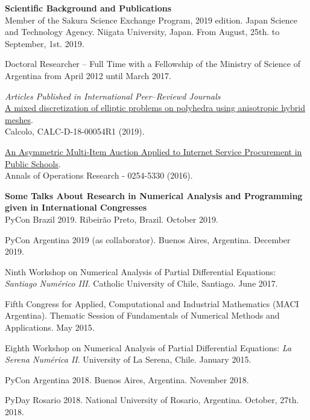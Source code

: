 \textbf{Scientific Background and Publications}\\[6pt]
Member of the Sakura Science Exchange Program, 2019 edition. Japan Science and
Technology Agency. Niigata University, Japan. From August, 25th. to September, 1st. 2019.

Doctoral Researcher -- Full Time with a Fellowship of the Ministry of 
Science of Argentina from April 2012 until March 2017.

\emph{Articles Published in International Peer--Reviewd Journals}\\
\href{http://em.rdcu.be/wf/click?upn=lMZy1lernSJ7apc5DgYM8RtiRnX98cgbvE81KQGn5tE-3D_-2Fq09Vpjrycd-2BAOhvYDidHaHWLaG8WMoWs1lRs2mKTzqCwYNFhlGtplH8kb8yUCOrEFESCWAEP1qrD-2BJgg09nu-2Fz61XDXWYdppeXx4JzFRLvI-2FYyjZMrov-2FaxFxLv9MaqfC-2BjYanB-2FkLIArphbTB7hvuq-2BJ-2BP0dpoVrgh2NJYizQcMbyo6AA8jcx6RYsWvb3RMk9c7QXTqmoLaHKr8Xg6yK2lC1IxrYwuPPxXUxfxXQc0WAqTO-2Bg-2F9P-2BWkhJXyogoqkg5GNjl1KqQhJV5xi014g-3D-3D}
{\color{blue}A mixed discretization of elliptic problems on polyhedra using anisotropic hybrid meshes}.\\
Calcolo, CALC-D-18-00054R1 (2019).

\href{https://www.dropbox.com/s/1ai0z0pcyhskpzp/JM-2016.pdf?dl=0}
{\color{blue}An Asymmetric Multi-Item Auction Applied
to Internet Service Procurement in Public Schools}.\\
Annals of Operations Research - 0254-5330 (2016).

\textbf{Some Talks About Research in Numerical Analysis and Programming given
in International Congresses}\\[6pt]
PyCon Brazil 2019. Ribeir\~ao Preto, Brazil. October 2019.

PyCon Argentina 2019 (as collaborator). Buenos Aires, Argentina. December 2019.

Ninth Workshop on Numerical Analysis of Partial Differential Equations: 
\emph{Santiago Num\'erico III}. Catholic University of Chile, Santiago. June 2017.

Fifth Congress for Applied, Computational and Industrial Mathematics (MACI Argentina).
Thematic Session of Fundamentals of Numerical Methods and Applications. May 2015.

Eighth Workshop on Numerical Analysis of Partial Differential Equations:
\emph{La Serena Num\'erica II}. University of La Serena, Chile. January 2015.

PyCon Argentina 2018. Buenos Aires, Argentina. November 2018.

PyDay Rosario 2018. National University of Rosario, Argentina. October, 27th.
2018.

